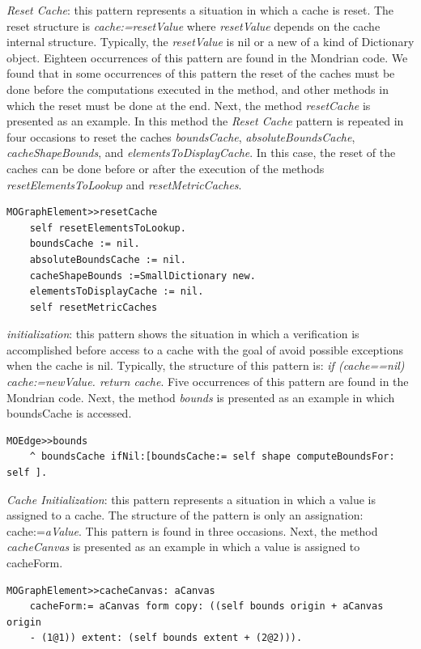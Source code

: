 \documentclass[preprint,10pt]{sigplanconf}
\begin{document}
\emph{Reset Cache}: this pattern represents a situation in which a
cache is reset. The reset structure is \emph{cache:=resetValue} where
\emph{resetValue} depends on the cache internal structure. Typically,
the \emph{resetValue} is nil or a new of a kind of Dictionary object.
Eighteen occurrences of this pattern are found in the Mondrian code. 
We found that in some occurrences of this pattern the reset of the caches must be done before the computations executed in the method, and other methods in which the reset must be done at the end. 
Next, the method \emph{resetCache} is presented as an example. In
this method the \emph{Reset Cache} pattern is repeated in four occasions
to reset the caches \emph{boundsCache}, \emph{absoluteBoundsCache},
\emph{cacheShapeBounds}, and \emph{elementsToDisplayCache}. In this case, the reset of the caches can be done before or after the execution of the methods \emph{resetElementsToLookup} and  \emph{resetMetricCaches}.

\begin{lstlisting} 
MOGraphElement>>resetCache 
	self resetElementsToLookup.
	boundsCache := nil. 
	absoluteBoundsCache := nil. 
	cacheShapeBounds :=SmallDictionary new. 
	elementsToDisplayCache := nil. 
	self resetMetricCaches
\end{lstlisting}

\emph{
 initialization}: this pattern shows
the situation in which a verification is accomplished before access
to a cache with the goal of avoid possible exceptions when the cache
is nil. Typically, the structure of this pattern is: \emph{if (cache==nil)
cache:=newValue. return cache}. Five occurrences of this pattern are
found in the Mondrian code. Next, the method \emph{bounds} is presented
as an example in which boundsCache is accessed.

\begin{lstlisting} 
MOEdge>>bounds  
	^ boundsCache ifNil:[boundsCache:= self shape computeBoundsFor: self ]. 
\end{lstlisting}

\emph{Cache Initialization}: this pattern represents a situation in
which a value is assigned to a cache. The structure of the pattern
is only an assignation: cache:=\emph{aValue}. This pattern is found
in three occasions. Next, the method \emph{cacheCanvas} is presented
as an example in which a value is assigned to cacheForm.

\begin{lstlisting} 
MOGraphElement>>cacheCanvas: aCanvas 
	cacheForm:= aCanvas form copy: ((self bounds origin + aCanvas origin 
	- (1@1)) extent: (self bounds extent + (2@2))). 
\end{lstlisting}
\end{document}
